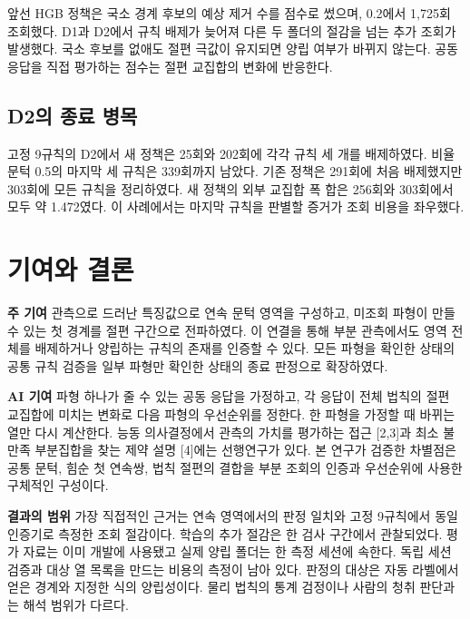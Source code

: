 \documentclass[11pt,a4paper]{article}
\newcommand{\lead}[1]{\textcolor{accent}{\sffamily\bfseries #1}}
\begin{document}
앞선 HGB 정책은 국소 경계 후보의 예상 제거 수를 점수로 썼으며, 0.2에서 1,725회 조회했다. D1과 D2에서 규칙 배제가 늦어져 다른 두 폴더의 절감을 넘는 추가 조회가 발생했다. 국소 후보를 없애도 절편 극값이 유지되면 양립 여부가 바뀌지 않는다. 공동 응답을 직접 평가하는 점수는 절편 교집합의 변화에 반응한다.

\subsection*{D2의 종료 병목}
고정 9규칙의 D2에서 새 정책은 25회와 202회에 각각 규칙 세 개를 배제하였다. 비율 문턱 0.5의 마지막 세 규칙은 339회까지 남았다. 기존 정책은 291회에 처음 배제했지만 303회에 모든 규칙을 정리하였다. 새 정책의 외부 교집합 폭 합은 256회와 303회에서 모두 약 1.472였다. 이 사례에서는 마지막 규칙을 판별할 증거가 조회 비용을 좌우했다.

\clearpage
\section{기여와 결론}
\lead{주 기여}\quad
관측으로 드러난 특징값으로 연속 문턱 영역을 구성하고, 미조회 파형이 만들 수 있는 첫 경계를 절편 구간으로 전파하였다. 이 연결을 통해 부분 관측에서도 영역 전체를 배제하거나 양립하는 규칙의 존재를 인증할 수 있다. 모든 파형을 확인한 상태의 공통 규칙 검증을 일부 파형만 확인한 상태의 종료 판정으로 확장하였다.

\lead{AI 기여}\quad
파형 하나가 줄 수 있는 공동 응답을 가정하고, 각 응답이 전체 법칙의 절편 교집합에 미치는 변화로 다음 파형의 우선순위를 정한다. 한 파형을 가정할 때 바뀌는 열만 다시 계산한다. 능동 의사결정에서 관측의 가치를 평가하는 접근 [2,3]과 최소 불만족 부분집합을 찾는 제약 설명 [4]에는 선행연구가 있다. 본 연구가 검증한 차별점은 공통 문턱, 힘순 첫 연속쌍, 법칙 절편의 결합을 부분 조회의 인증과 우선순위에 사용한 구체적인 구성이다.

\lead{결과의 범위}\quad
가장 직접적인 근거는 연속 영역에서의 판정 일치와 고정 9규칙에서 동일 인증기로 측정한 조회 절감이다. 학습의 추가 절감은 한 검사 구간에서 관찰되었다. 평가 자료는 이미 개발에 사용됐고 실제 양립 폴더는 한 측정 세션에 속한다. 독립 세션 검증과 대상 열 목록을 만드는 비용의 측정이 남아 있다. 판정의 대상은 자동 라벨에서 얻은 경계와 지정한 식의 양립성이다. 물리 법칙의 통계 검정이나 사람의 청취 판단과는 해석 범위가 다르다.
\end{document}
